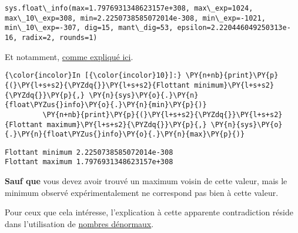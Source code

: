     \begin{Verbatim}[commandchars=\\\{\}]
sys.float\_info(max=1.7976931348623157e+308, max\_exp=1024, max\_10\_exp=308, min=2.2250738585072014e-308, min\_exp=-1021, min\_10\_exp=-307, dig=15, mant\_dig=53, epsilon=2.220446049250313e-16, radix=2, rounds=1)

    \end{Verbatim}

    Et notamment,
\href{https://docs.python.org/3/library/sys.html\#sys.float_info}{comme
expliqué ici}.

    \begin{Verbatim}[commandchars=\\\{\}]
{\color{incolor}In [{\color{incolor}10}]:} \PY{n+nb}{print}\PY{p}{(}\PY{l+s+s2}{\PYZdq{}}\PY{l+s+s2}{Flottant minimum}\PY{l+s+s2}{\PYZdq{}}\PY{p}{,} \PY{n}{sys}\PY{o}{.}\PY{n}{float\PYZus{}info}\PY{o}{.}\PY{n}{min}\PY{p}{)}
         \PY{n+nb}{print}\PY{p}{(}\PY{l+s+s2}{\PYZdq{}}\PY{l+s+s2}{Flottant maximum}\PY{l+s+s2}{\PYZdq{}}\PY{p}{,} \PY{n}{sys}\PY{o}{.}\PY{n}{float\PYZus{}info}\PY{o}{.}\PY{n}{max}\PY{p}{)}
\end{Verbatim}


    \begin{Verbatim}[commandchars=\\\{\}]
Flottant minimum 2.2250738585072014e-308
Flottant maximum 1.7976931348623157e+308

    \end{Verbatim}

    \textbf{Sauf que} vous devez avoir trouvé un maximum voisin de cette
valeur, mais le minimum observé expérimentalement ne correspond pas bien
à cette valeur.

Pour ceux que cela intéresse, l'explication à cette apparente
contradiction réside dans l'utilisation de
\href{http://en.wikipedia.org/wiki/Denormal\%5Fnumber}{nombres
dénormaux}.


    
    
    
